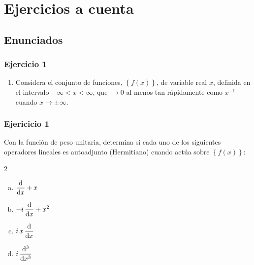 \documentclass[12pt]{beamer}
\begin{document}
\section{Ejercicios a cuenta}
\subsection{Enunciados}

\begin{frame}
\frametitle{Ejercicio 1}
\begin{enumerate}[<+->]
\item Considera el conjunto de funciones, $\left\{ f (x) \right\}$, de variable real $x$, definida en el intervalo $-\infty < x < \infty$, que $\to 0$ al menos tan rápidamente como $x^{-1}$ cuando $x \to \pm \infty$.
\seti
\end{enumerate}
\end{frame}
\begin{frame}
\frametitle{Ejericicio 1}
Con la función de peso unitaria, determina si cada uno de los siguientes operadores lineales es autoadjunto (Hermitiano) cuando actúa sobre $\left\{ f (x) \right\}$:
\begin{multicols}{2}
  \begin{enumerate}[a)]
    \item $\displaystyle \dv{x} + x$
    \item $\displaystyle - i \, \dv{x} + x^{2}$
    \item $\displaystyle i \, x \, \dv{x}$
    \item $\displaystyle i \, \dv[3]{x}$
  \end{enumerate}
\end{multicols}
\end{frame}
\end{document}
